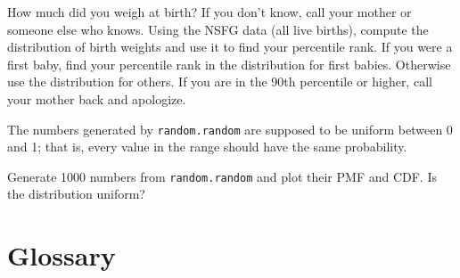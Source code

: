 \begin{exercise}
How much did you weigh at birth?  If you don't know, call your mother
or someone else who knows.  Using the NSFG data (all live births),
compute the distribution of birth weights and use it to find your
percentile rank.  If you were a first baby, find your percentile rank
in the distribution for first babies.  Otherwise use the distribution
for others.  If you are in the 90th percentile or higher, call your
mother back and apologize.

\end{exercise}

\begin{exercise}
The numbers generated by {\tt random.random} are supposed to be
uniform between 0 and 1; that is, every value in the range
should have the same probability.

Generate 1000 numbers from {\tt random.random} and plot their
PMF and CDF.  Is the distribution uniform?

\end{exercise}


\section{Glossary}

